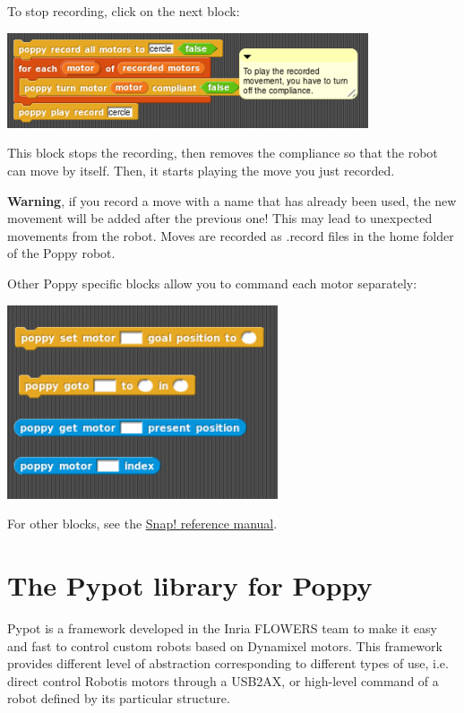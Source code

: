 \documentclass{article}
\begin{document}
 To stop recording, click on the next block:
 
 
 \begin{center}
  \includegraphics[width=0.8\textwidth]{img/snap_move}
 \end{center}
 
 This block stops the recording, then removes the compliance so that the robot can move by itself. Then, it starts playing the move you just recorded.
 
 \textbf{Warning}, if you record a move with a name that has already been used, the new movement will be added after the previous one! This may lead to unexpected movements from the robot. Moves are recorded as .record files in the home folder of the Poppy robot.
 
 Other Poppy specific blocks allow you to command each motor separately:
 
  \begin{center}
  \includegraphics[width=0.6\textwidth]{img/snap_blocks}
 \end{center}

For other blocks, see the \href{http://snap.berkeley.edu/SnapManual.pdf}{Snap! reference manual}.


\section{The Pypot library for Poppy}
\label{pypot}

Pypot is a framework developed in the Inria FLOWERS team to make it easy and fast to control custom robots based on Dynamixel motors. This framework provides different level of abstraction corresponding to different types of use, i.e. direct control Robotis motors through a USB2AX, or high-level command of a robot defined by its particular structure.
\end{document}
